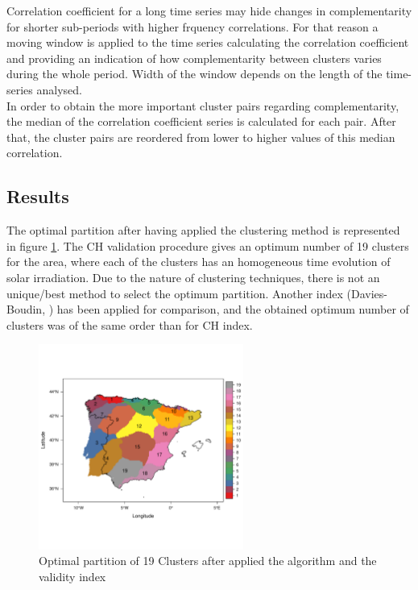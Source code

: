 Correlation coefficient for a long time series may hide changes in complementarity for shorter sub-periods with higher frquency correlations. For that reason a moving window is applied to the time series calculating the correlation coefficient and providing an indication of how complementarity between clusters varies during the whole period. Width of the window depends on the length of the time-series analysed.\\

In order to obtain the more important cluster pairs regarding complementarity, the median of the correlation coefficient series is calculated for each pair. After that, the cluster pairs are reordered from lower to higher values of this median correlation.\\
 

\subsection{Results}

The optimal partition after having applied the clustering method is represented in figure \ref{clusters}. The CH validation procedure gives an optimum number of 19 clusters for the area, where each of the clusters has an homogeneous time evolution of solar irradiation. Due to the nature of clustering techniques, there is not an unique/best method to select the optimum partition. Another index (Davies-Boudin, \cite{davies1979cluster}) has been applied for comparison, and the obtained optimum number of clusters was of the same order than for CH index.
 
\begin{figure}[h!]
\centering\includegraphics[width=0.6\textwidth]{figs/capitulo5/clusters2}
\caption{Optimal partition of 19 Clusters after applied the algorithm and the validity index}
\label{clusters}
\end{figure}

